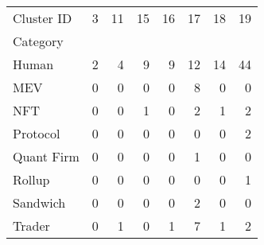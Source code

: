 \begin{tabular}{lrrrrrrr}
\toprule
Cluster ID &  3  &  11 &  15 &  16 &  17 &  18 &  19 \\
Category   &     &     &     &     &     &     &     \\
\midrule
Human      &   2 &   4 &   9 &   9 &  12 &  14 &  44 \\
MEV        &   0 &   0 &   0 &   0 &   8 &   0 &   0 \\
NFT        &   0 &   0 &   1 &   0 &   2 &   1 &   2 \\
Protocol   &   0 &   0 &   0 &   0 &   0 &   0 &   2 \\
Quant Firm &   0 &   0 &   0 &   0 &   1 &   0 &   0 \\
Rollup     &   0 &   0 &   0 &   0 &   0 &   0 &   1 \\
Sandwich   &   0 &   0 &   0 &   0 &   2 &   0 &   0 \\
Trader     &   0 &   1 &   0 &   1 &   7 &   1 &   2 \\
\bottomrule
\end{tabular}
